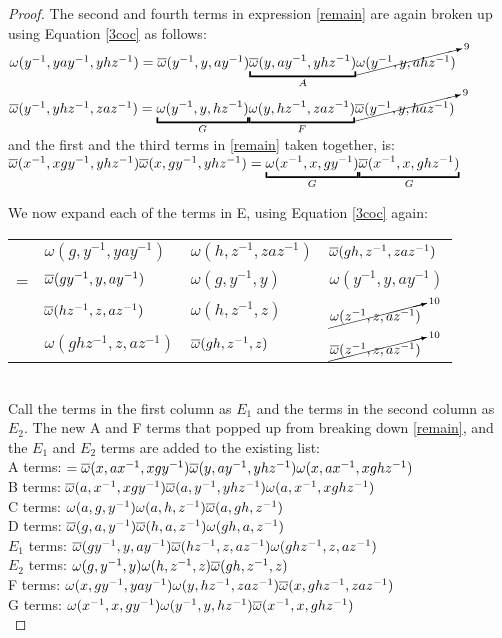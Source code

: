\begin{proof}
\noindent The second and fourth terms in expression \ref{remain} are again broken up using Equation \ref{3coc} as follows:\\
$\omega(y^{-1}, yay^{-1}, yhz^{-1}) = \ol{\omega}(y^{-1}, y, ay^{-1}) \us{A}{\underbracket{\ol{\omega}(y, ay^{-1}, yhz^{-1})}} \cancelto{9}{\omega(y^{-1}, y, ahz^{-1})}$\\
$\ol{\omega}(y^{-1}, yhz^{-1}, zaz^{-1}) = \us{G}{\underbracket{\omega(y^{-1}, y, hz^{-1})}} \us{F}{\underbracket{\omega(y, hz^{-1}, zaz^{-1})}} \cancelto{9}{\ol{\omega}(y^{-1}, y, haz^{-1})} $\\
and the first and the third terms in \ref{remain} taken together, is:\\
$\ol{\omega}(x^{-1}, xgy^{-1}, yhz^{-1}) \ol{\omega}(x, gy^{-1}, yhz^{-1}) = \us{G}{\underbracket{\omega(x^{-1}, x, gy^{-1})}} \us{G}{\underbracket{\ol{\omega}(x^{-1}, x, ghz^{-1})}}$

We now expand each of the terms in E, using Equation \ref{3coc} again:\\
\begin{tabular}{llll}
& $\omega(g, y^{-1}, yay^{-1})$ & $\omega(h, z^{-1}, zaz^{-1})$ & $\overline{\omega}(gh, z^{-1}, zaz^{-1})$\\
= & $\overline{\omega}(gy^{-1}, y, ay^{-1})$ &$\omega(g, y^{-1}, y)$ & $\omega(y^{-1}, y, ay^{-1})$\\
&$\overline{\omega}(hz^{-1}, z, az^{-1})$ & $\omega(h, z^{-1}, z)$ & $\cancelto{10}{\omega(z^{-1}, z, az^{-1})}$ \\
&  $\omega(ghz^{-1}, z, az^{-1})$ & $\overline{\omega}(gh, z^{-1}, z)$ & $\cancelto{10}{\overline{\omega}(z^{-1}, z, az^{-1})}$ \\
\end{tabular}\\
Call the terms in the first column as $E_1$ and the terms in the second column as $E_2$. The new A and F terms that popped up from breaking down \ref{remain}, and the $E_1$ and $E_2$ terms are added to the existing list:\\
\noindent
A terms: $= \overline{\omega}(x, ax^{-1}, xgy^{-1}) \overline{\omega}(y, ay^{-1}, yhz^{-1}) \omega(x, ax^{-1}, xghz^{-1})$\\
B terms: $\overline{\omega}(a, x^{-1}, xgy^{-1}) \overline{\omega}(a, y^{-1}, yhz^{-1}) \omega(a, x^{-1}, xghz^{-1})$\\
C terms:  $\omega(a,g,y^{-1})  \omega(a, h, z^{-1})  \overline{\omega}(a, gh,z^{-1})$\\
D terms: $\overline{\omega}(g, a, y^{-1}) \overline{\omega}(h, a, z^{-1}) \omega(gh, a, z^{-1}) $\\ 
$E_1$ terms: $\overline{\omega}(gy^{-1}, y, ay^{-1}) \overline{\omega}(hz^{-1}, z, az^{-1}) \omega(ghz^{-1}, z, az^{-1})$\\
$E_2$ terms: $\omega(g, y^{-1}, y) \omega(h, z^{-1}, z) \overline{\omega}(gh, z^{-1}, z)$\\
F terms: $\omega(x, gy^{-1}, yay^{-1})  \omega(y, hz^{-1}, zaz^{-1}) \overline{\omega}(x, ghz^{-1}, zaz^{-1})$\\
G terms: $\omega(x^{-1}, x, gy^{-1}) \omega(y^{-1}, y, hz^{-1}) \overline{\omega}(x^{-1}, x, ghz^{-1})$\\


\end{proof}
